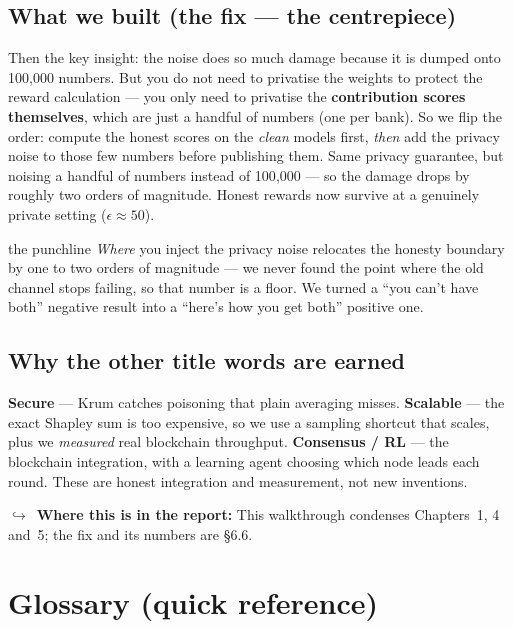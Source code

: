 \documentclass[11pt]{article}
\newcommand{\reportnote}[1]{%
  \par\vspace{3pt}%
  {\small\color{soft}$\hookrightarrow$\ \textbf{Where this is in the report:} #1}\par\vspace{2pt}}
\begin{document}
\subsection{What we built (the fix --- the centrepiece)}
Then the key insight: the noise does so much damage because it is dumped onto 100{,}000 numbers. But you
do not need to privatise the weights to protect the reward calculation --- you only need to privatise the
\textbf{contribution scores themselves}, which are just a handful of numbers (one per bank). So we flip
the order: compute the honest scores on the \emph{clean} models first, \emph{then} add the privacy noise
to those few numbers before publishing them. Same privacy guarantee, but noising a handful of numbers
instead of 100{,}000 --- so the damage drops by roughly two orders of magnitude. Honest rewards now
survive at a genuinely private setting ($\epsilon\approx50$).

\begin{plain}{the punchline}
\emph{Where} you inject the privacy noise relocates the honesty boundary by one to two orders of
magnitude ---
we never found the point where the old channel stops failing, so that number is a floor. We turned a
``you can't have both'' negative result into a ``here's how you get both'' positive one.
\end{plain}

\subsection{Why the other title words are earned}
\textbf{Secure} --- Krum catches poisoning that plain averaging misses. \textbf{Scalable} --- the exact
Shapley sum is too expensive, so we use a sampling shortcut that scales, plus we \emph{measured} real
blockchain throughput. \textbf{Consensus / RL} --- the blockchain integration, with a learning agent
choosing which node leads each round. These are honest integration and measurement, not new inventions.

\reportnote{This walkthrough condenses Chapters~1, 4 and~5; the fix and its numbers are §6.6.}

\section{Glossary (quick reference)}
\end{document}
